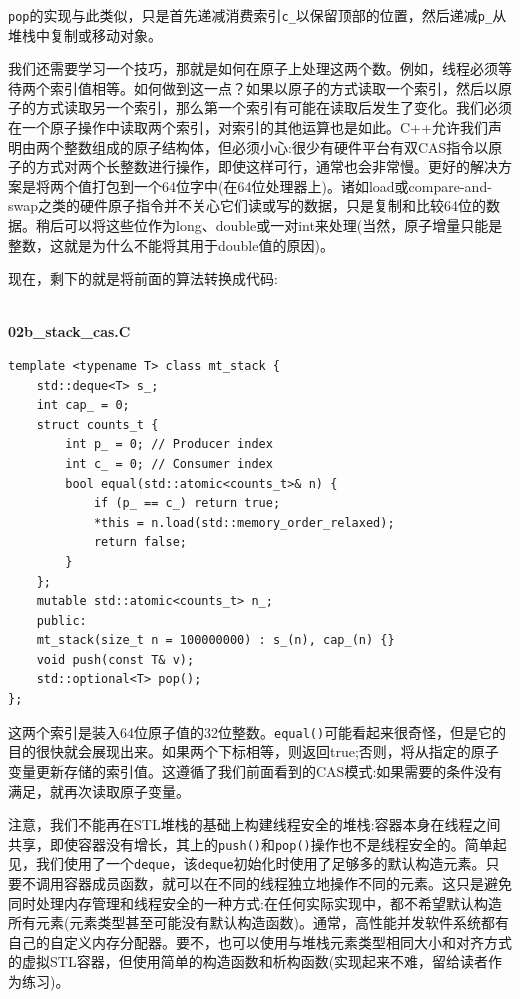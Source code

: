 \texttt{pop}的实现与此类似，只是首先递减消费索引\texttt{c\_}以保留顶部的位置，然后递减\texttt{p\_}从堆栈中复制或移动对象。

我们还需要学习一个技巧，那就是如何在原子上处理这两个数。例如，线程必须等待两个索引值相等。如何做到这一点？如果以原子的方式读取一个索引，然后以原子的方式读取另一个索引，那么第一个索引有可能在读取后发生了变化。我们必须在一个原子操作中读取两个索引，对索引的其他运算也是如此。C++允许我们声明由两个整数组成的原子结构体，但必须小心:很少有硬件平台有双CAS指令以原子的方式对两个长整数进行操作，即使这样可行，通常也会非常慢。更好的解决方案是将两个值打包到一个64位字中(在64位处理器上)。诸如load或compare-and-swap之类的硬件原子指令并不关心它们读或写的数据，只是复制和比较64位的数据。稍后可以将这些位作为long、double或一对int来处理(当然，原子增量只能是整数，这就是为什么不能将其用于double值的原因)。

现在，剩下的就是将前面的算法转换成代码:

\hspace*{\fill} \\ %
\noindent
\textbf{02b\_stack\_cas.C}
\begin{lstlisting}[style=styleCXX]
template <typename T> class mt_stack {
	std::deque<T> s_;
	int cap_ = 0;
	struct counts_t {
		int p_ = 0; // Producer index
		int c_ = 0; // Consumer index
		bool equal(std::atomic<counts_t>& n) {
			if (p_ == c_) return true;
			*this = n.load(std::memory_order_relaxed);
			return false;
		}
	};
	mutable std::atomic<counts_t> n_;
	public:
	mt_stack(size_t n = 100000000) : s_(n), cap_(n) {}
	void push(const T& v);
	std::optional<T> pop();
};
\end{lstlisting}

这两个索引是装入64位原子值的32位整数。\texttt{equal()}可能看起来很奇怪，但是它的目的很快就会展现出来。如果两个下标相等，则返回true;否则，将从指定的原子变量更新存储的索引值。这遵循了我们前面看到的CAS模式:如果需要的条件没有满足，就再次读取原子变量。

注意，我们不能再在STL堆栈的基础上构建线程安全的堆栈:容器本身在线程之间共享，即使容器没有增长，其上的\texttt{push()}和\texttt{pop()}操作也不是线程安全的。简单起见，我们使用了一个\texttt{deque}，该\texttt{deque}初始化时使用了足够多的默认构造元素。只要不调用容器成员函数，就可以在不同的线程独立地操作不同的元素。这只是避免同时处理内存管理和线程安全的一种方式:在任何实际实现中，都不希望默认构造所有元素(元素类型甚至可能没有默认构造函数)。通常，高性能并发软件系统都有自己的自定义内存分配器。要不，也可以使用与堆栈元素类型相同大小和对齐方式的虚拟STL容器，但使用简单的构造函数和析构函数(实现起来不难，留给读者作为练习)。

